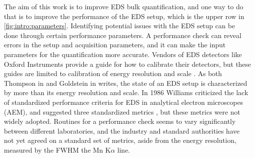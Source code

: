 The aim of this work is to improve EDS bulk quantification, and one way to do that is to improve the performance of the EDS setup, which is the upper row in \cref{fig:intro:parameters}.
Identifying potential issues with the EDS setup can be done through certain performance parameters.
A performance check can reveal errors in the setup and acquisition parameters, and it can make the input parameters for the quantification more accurate.
Vendors of EDS detectors like Oxford Instruments provide a guide for how to calibrate their detectors, but these guides are limited to calibration of energy resolution and scale \cite{aztec_manual}.
As both Thompson in \cite{keith_energy_res_2013} and Goldstein in \cite{goldstein_scanning_2018} writes, the state of an EDS setup is characterized by more than its energy resolution and scale.
In 1986 Williams criticized the lack of standardized performance criteria for EDS in analytical electron microscopes (AEM), and suggested three standardized metrics \cite{williams_standard_definitions_1986}, but these metrics were not widely adopted.
Routines for a performance check seems to vary significantly between different laboratories, and the industry and standard authorities have not yet agreed on a standard set of metrics, aside from the energy resolution, measured by the FWHM the Mn K$\alpha$ line.


